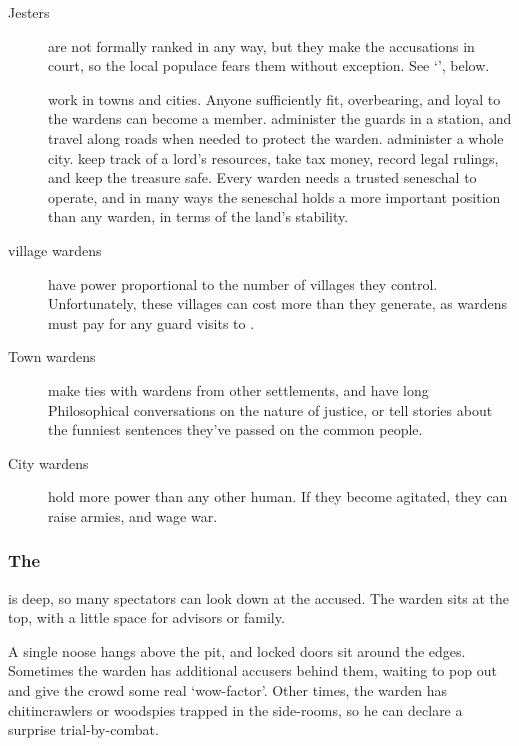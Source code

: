 \begin{multicols}{2}
\begin{description}
  \item[Jesters]
  are not formally ranked in any way, but they make the accusations in court, so the local populace fears them without exception.
  See `', below.
  \item[]
  work in towns and cities.
  Anyone sufficiently fit, overbearing, and loyal to the \glspl{warden} can become a member.
  administer the guards in a station, and travel along roads when needed to protect the \gls{warden}.
  administer a whole city.
  keep track of a lord's resources, take tax money, record legal rulings, and keep the treasure safe.
  Every \gls{warden} needs a trusted seneschal to operate, and in many ways the seneschal holds a more important position than any \gls{warden}, in terms of the land's stability.
  \item[\Gls{village} \Glspl{warden}]
  have power proportional to the number of \glspl{village} they control.
  Unfortunately, these \glspl{village} can cost more than they generate, as \glspl{warden} must pay for any \gls{guard} visits to .
  \item[Town \Glspl{warden}]
  make ties with \glspl{warden} from other settlements, and have long Philosophical conversations on the nature of justice, or tell stories about the funniest sentences they've passed on the common people.
  \item[City \Glspl{warden}]
  hold more power than any other human.
  If they become agitated, they can raise armies, and wage war.
\end{description}


\subsubsection{The }
\label{pitOfJustice}
is deep, so many spectators can look down at the accused.
The \gls{warden} sits at the top, with a little space for advisors or family.

A single noose hangs above the pit, and locked doors sit around the edges.
Sometimes the \gls{warden} has additional accusers behind them, waiting to pop out and give the crowd some real `wow-factor'.
Other times, the \gls{warden} has chitincrawlers or woodspies trapped in the side-rooms, so he can declare a surprise trial-by-combat.


\end{multicols}
